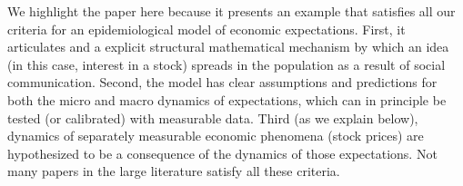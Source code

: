 We highlight the paper here because it presents an example that satisfies all our criteria for an epidemiological model of economic expectations. First, it articulates and a explicit structural mathematical mechanism by which an idea (in this case, interest in a stock) spreads in the population as a result of social communication. Second, the model has clear assumptions and predictions for both the micro and macro dynamics of expectations, which can in principle be tested (or calibrated) with measurable data.  Third (as we explain below), dynamics of separately measurable economic phenomena (stock prices) are hypothesized to be a consequence of the dynamics of those expectations.  Not many papers in the large literature satisfy all these criteria.

